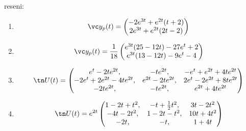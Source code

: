 \pagebreak
reseni:
\begin{enumerate}
\item
\[
  \vc y_p(t)=\begin{pmatrix}
                     -2e^{3t}+e^{2t}(t+2)\\
                     2e^{3t}+e^{2t}(2t-2)
                     \end{pmatrix}
\]
\item
\[
  \vc y_p(t)=\frac{1}{18}\begin{pmatrix}
                e^{3t}(25-12t)-27e^t+2\\
                e^{3t}(13-12t)-9e^t-4     
             \end{pmatrix}
\]
\item
\[
  \tn U(t)=
  \begin{pmatrix}
    e^t-2te^{2t},& -te^{2t},& -e^t+e^{2t}+4t e^{2t}\\
    -2e^t+2e^{2t}-4te^{2t},& e^{2t}-2t e^{2t},& 2e^t-2e^{2t}+8t e^{2t}\\
    -2t e^{2t},& -te^{2t},& e^{2t}+4t e^{2t}
  \end{pmatrix}
\]

\item
\[
  \tn U(t)=e^{2t}
  \begin{pmatrix}
     1-2t+t^2,& -t+\frac12 t^2,& 3t-2t^2\\
     -4t-2t^2,& 1-2t-t^2,& 10t+4t^2\\
     -2t,& -t,& 1+4t
  \end{pmatrix}
\]
\end{enumerate}




